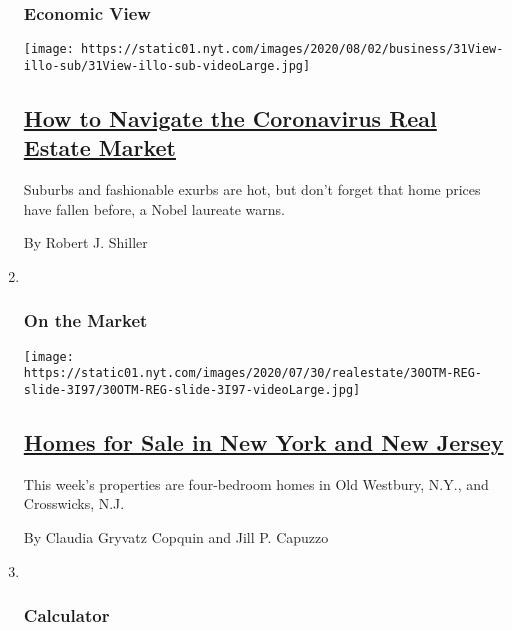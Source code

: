 \begin{enumerate}
{  \subsubsection{Economic View}\label{economic-view}}

  \texttt{[image: https://static01.nyt.com/images/2020/08/02/business/31View-illo-sub/31View-illo-sub-videoLarge.jpg]}

  \hypertarget{how-to-navigate-the-coronavirus-real-estate-market}{%
  \subsection{\texorpdfstring{\href{/2020/07/31/business/housing-market-prices-risk.html}{How
  to Navigate the Coronavirus Real Estate
  Market}}{How to Navigate the Coronavirus Real Estate Market}}\label{how-to-navigate-the-coronavirus-real-estate-market}}

  Suburbs and fashionable exurbs are hot, but don't forget that home
  prices have fallen before, a Nobel laureate warns.

  By Robert J. Shiller
\item ~
  \hypertarget{on-the-market-1}{%
  \subsubsection{On the Market}\label{on-the-market-1}}

  \texttt{[image: https://static01.nyt.com/images/2020/07/30/realestate/30OTM-REG-slide-3I97/30OTM-REG-slide-3I97-videoLarge.jpg]}

  \hypertarget{homes-for-sale-in-new-york-and-new-jersey}{%
  \subsection{\texorpdfstring{\href{/2020/07/30/realestate/homes-for-sale-in-new-york-and-new-jersey.html}{Homes
  for Sale in New York and New
  Jersey}}{Homes for Sale in New York and New Jersey}}\label{homes-for-sale-in-new-york-and-new-jersey}}

  This week's properties are four-bedroom homes in Old Westbury, N.Y.,
  and Crosswicks, N.J.

  By Claudia Gryvatz Copquin and Jill P. Capuzzo
\item ~
  \hypertarget{calculator}{%
  \subsubsection{Calculator}\label{calculator}}


\end{enumerate}
